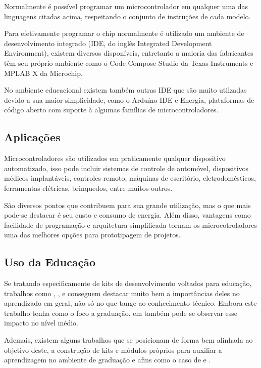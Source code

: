 Normalmente é possível programar um microcontrolador em qualquer uma das linguagens citadas acima, respeitando o conjunto de instruções de cada modelo.

Para efetivamente programar o chip normalmente é utilizado um ambiente de desenvolvimento integrado (IDE, do inglês Integrated Development Environment), existem diversos disponíveis, entretanto a maioria das fabricantes têm seu próprio ambiente como o Code Compose Studio da Texas Instruments e MPLAB X da Microchip.

No ambiente educacional existem também outras IDE que são muito utilzadas devido a sua maior simplicidade, como o Arduíno IDE e Energia, plataformas de código aberto com suporte à algumas famílias de microcontroladores.

\subsection{Aplicações}

Microcontroladores são utilizados em praticamente qualquer dispositivo automatizado, isso pode incluir sistemas de controle de automóvel, dispositivos médicos implantáveis, controles remoto, máquinas de escritório, eletrodomésticos, ferramentas elétricas, brinquedos, entre muitos outros.

São diversos pontos que contribuem para sua grande utilização, mas o que mais pode-se destacar é seu custo e consumo de energia. Além disso, vantagens como facilidade de programação e arquitetura simplificada tornam os microcotroladores uma das melhores opções para prototipagem de projetos.

\subsection{Uso da Educação}

Se tratando especificamente de kits de desenvolvimento voltados para educação, trabalhos como , ,  e  conseguem destacar muito bem a importâncias deles no aprendizado em geral, não só no que tange ao conhecimento técnico. Embora este trabalho tenha como o foco a graduação, em  também pode se observar esse impacto no nível médio.

Ademais, existem alguns trabalhos que se posicionam de forma bem alinhada ao objetivo deste, a construção de kits e módulos próprios para auxiliar a aprendizagem no ambiente de graduação e afins como o caso de  e .

